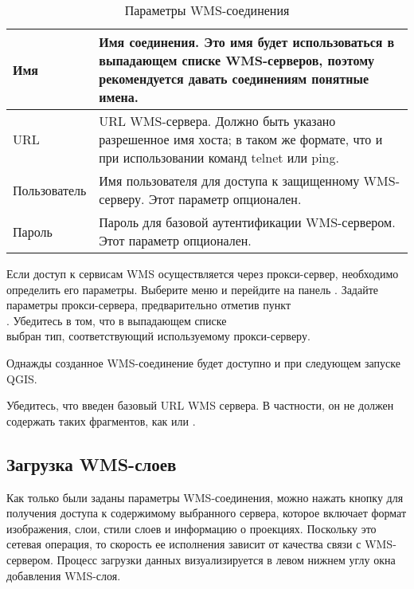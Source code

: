 \begin{table}[ht]
\centering
 \begin{tabular}{|l|p{11cm}|}
\hline Имя & Имя соединения. Это имя будет использоваться в выпадающем
списке WMS-серверов, поэтому рекомендуется давать соединениям понятные имена. \\
\hline URL \index{WMS!URL} & URL WMS-сервера.
 Должно быть указано разрешенное имя хоста; в таком же формате, что и при
 использовании команд telnet или ping. \\
\hline Пользователь \index{WMS!аутентификация} & Имя пользователя для доступа к
 защищенному WMS-серверу. Этот параметр опционален. \\
\hline Пароль & Пароль для базовой аутентификации WMS-сервером. Этот параметр
опционален.\\
\hline
\end{tabular}
\caption{Параметры WMS-соединения}\label{tab:wms_connection_parms}
\end{table}

Если доступ к сервисам WMS осуществляется через прокси-сервер, необходимо
определить его параметры. Выберите меню  \arrow
{} и перейдите на панель . Задайте параметры прокси-сервера, предварительно отметив пункт \\
.
Убедитесь в том, что в выпадающем списке \\
 выбран тип, соответствующий используемому прокси-серверу.

Однажды созданное WMS-соединение будет доступно и при следующем запуске
QGIS.

\begin{Tip}[ht]\caption{\textsc{URL WMS серверов}}
Убедитесь, что введен базовый URL WMS сервера. В частности, он не должен
содержать таких фрагментов, как  или
.
\end{Tip}

\subsection{Загрузка WMS-слоев}\label{sec:ogc-wms-layers}

Как только были заданы параметры WMS-соединения, можно нажать кнопку
 для получения доступа к содержимому выбранного
сервера, которое включает формат изображения, слои, стили слоев и
информацию о проекциях. Поскольку это сетевая операция, то скорость ее
исполнения зависит от качества связи с WMS-сервером. Процесс загрузки
данных визуализируется в левом нижнем углу окна добавления WMS-слоя.

